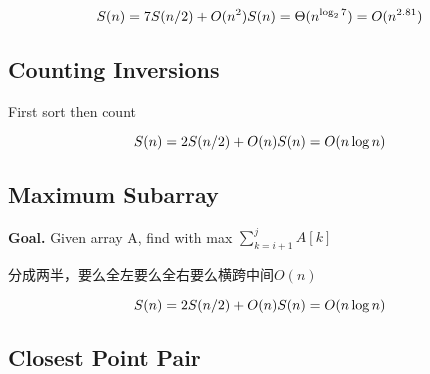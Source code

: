 \documentclass[]{article}
\begin{document}
\[S(n) = 7S(n/2)+O(n^2)\\
S(n) = \Theta(n^{\log_2 7}) = O(n^{2.81})\]

\hypertarget{counting-inversions}{%
\subsection{Counting Inversions}\label{counting-inversions}}

First sort then count

\[S(n) = 2S(n/2) + O(n) \\

S(n) = O(n\log n)\]

\hypertarget{maximum-subarray}{%
\subsection{Maximum Subarray}\label{maximum-subarray}}

\textbf{Goal.} Given array A, find with max \(\sum_{k = i+1}^j A[k]\)

分成两半，要么全左要么全右要么横跨中间\(O(n)\)

\[S(n) = 2S(n/2) + O(n) \\
S(n) = O(n \log n)\]

\hypertarget{closest-point-pair}{%
\subsection{Closest Point Pair}\label{closest-point-pair}}
\end{document}
